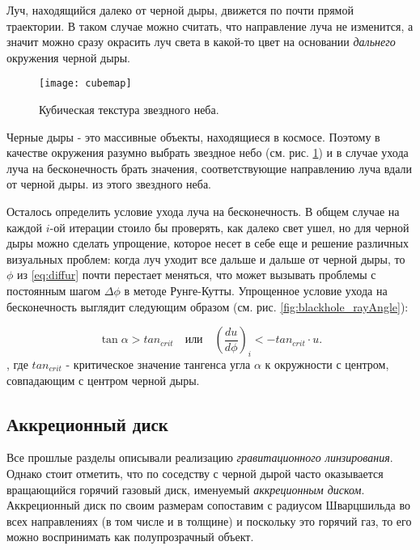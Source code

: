 Луч, находящийся далеко от черной дыры, движется по почти прямой траектории. В таком случае можно считать, что направление луча не изменится, а значит можно сразу окрасить луч света в какой-то цвет на основании \textit{дальнего} окружения черной дыры.

\newpage

\begin{figure}[h]
    \centering
    \texttt{[image: cubemap]}
    \caption{Кубическая текстура звездного неба.}
    \label{fig:cubemap}
\end{figure}

Черные дыры - это массивные объекты, находящиеся в космосе. Поэтому в качестве окружения разумно выбрать звездное небо (см. рис. \ref{fig:cubemap}) и в случае ухода луча на бесконечность брать значения, соответствующие направлению луча вдали от черной дыры. из этого звездного неба.

Осталось определить условие ухода луча на бесконечность. В общем случае на каждой $i$-ой итерации стоило бы проверять, как далеко свет ушел, но для черной дыры можно сделать упрощение, которое несет в себе еще и решение различных визуальных проблем: когда луч уходит все дальше и дальше от черной дыры, то $\phi$ из \eqref{eq:diffur} почти перестает меняться, что может вызывать проблемы с постоянным шагом $\Delta\phi$ в методе Рунге-Кутты. Упрощенное условие ухода на бесконечность выглядит следующим образом (см. рис. \ref{fig:blackhole_rayAngle}):

\begin{equation}
\label{eq:goes_to_infinity}
    \tan{\alpha} > tan_{crit} \quad \textit{или} \quad \left(\frac{du}{d\phi}\right)_i < -tan_{crit} \cdot u.
\end{equation}
, где $tan_{crit}$ - критическое значение тангенса угла $\alpha$ к окружности с центром, совпадающим с центром черной дыры.

\subsection{Аккреционный диск}
\label{subsec:accr_disk}

Все прошлые разделы описывали реализацию \textit{гравитационного линзирования}. Однако стоит отметить, что по соседству с черной дырой часто оказывается вращающийся горячий газовый диск, именуемый \textit{аккреционным диском}. Аккреционный диск по своим размерам сопоставим с радиусом Шварцшильда во всех направлениях (в том числе и в толщине) и поскольку это горячий газ, то его можно воспринимать как полупрозрачный объект.

